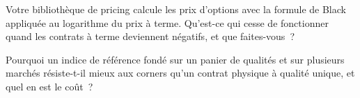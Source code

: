 \begin{interviewq}\label{iq:m3:crude-oil:5}
Votre bibliothèque de pricing calcule les prix d'options avec la formule de Black appliquée au logarithme du
prix à terme. Qu'est-ce qui cesse de fonctionner quand les contrats à terme deviennent négatifs, et que faites-vous~?
\end{interviewq}

\begin{interviewq}\label{iq:m3:crude-oil:6}
Pourquoi un indice de référence fondé sur un panier de qualités et sur plusieurs marchés résiste-t-il mieux aux corners
qu'un contrat physique à qualité unique, et quel en est le coût~?
\end{interviewq}
